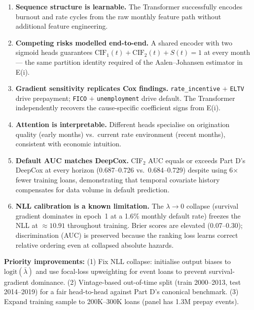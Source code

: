 \documentclass[11pt,a4paper]{article}
\begin{document}
\begin{enumerate}[leftmargin=1.6em,itemsep=3pt]

  \item \textbf{Sequence structure is learnable.}
        The Transformer successfully encodes burnout and rate cycles from the raw monthly
        feature path without additional feature engineering.

  \item \textbf{Competing risks modelled end-to-end.}
        A shared encoder with two sigmoid heads guarantees
        $\text{CIF}_1(t) + \text{CIF}_2(t) + S(t) = 1$ at every month --- the same
        partition identity required of the Aalen--Johansen estimator in E(i).

  \item \textbf{Gradient sensitivity replicates Cox findings.}
        \texttt{rate\_incentive} $+$ \texttt{ELTV} drive prepayment; \texttt{FICO} $+$
        \texttt{unemployment} drive default. The Transformer independently recovers
        the cause-specific coefficient signs from E(i).

  \item \textbf{Attention is interpretable.}
        Different heads specialise on origination quality (early months) vs.\ current
        rate environment (recent months), consistent with economic intuition.

  \item \textbf{Default AUC matches DeepCox.}
        CIF$_2$ AUC equals or exceeds Part D's DeepCox at every horizon (0.687--0.726 vs.\
        0.684--0.729) despite using 6$\times$ fewer training loans, demonstrating that
        temporal covariate history compensates for data volume in default prediction.

  \item \textbf{NLL calibration is a known limitation.}
        The $\lambda\!\to\!0$ collapse (survival gradient dominates in epoch~1 at a 1.6\%
        monthly default rate) freezes the NLL at $\approx\!10.91$ throughout training.
        Brier scores are elevated (0.07--0.30); discrimination (AUC) is preserved because
        the ranking loss learns correct relative ordering even at collapsed absolute hazards.

\end{enumerate}

\vspace{0.5em}
\textbf{Priority improvements:}
(1) Fix NLL collapse: initialise output biases to $\text{logit}(\bar\lambda)$ and use
focal-loss upweighting for event loans to prevent survival-gradient dominance.
(2) Vintage-based out-of-time split (train 2000--2013, test 2014--2019) for a fair
head-to-head against Part D's canonical benchmark.
(3) Expand training sample to 200K--300K loans (panel has 1.3M prepay events).
\end{document}
